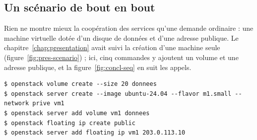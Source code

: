 \subsection*{Un scénario de bout en bout}

Rien ne montre mieux la coopération des services qu'une demande ordinaire : une machine virtuelle dotée d'un disque de données et
d'une adresse publique. Le chapitre~\ref{chap:presentation} avait suivi la création d'une machine seule (figure~\ref{fig:pres-scenario}) ; ici, cinq
commandes y ajoutent un volume et une adresse publique, et la figure~\ref{fig:concl-seq} en suit les appels.

\par\noindent\begin{minipage}{\linewidth}
\begin{lstlisting}[style=terminal]
$ openstack volume create --size 20 donnees
$ openstack server create --image ubuntu-24.04 --flavor m1.small --network prive vm1
$ openstack server add volume vm1 donnees
$ openstack floating ip create public
$ openstack server add floating ip vm1 203.0.113.10
\end{lstlisting}
\end{minipage}\par

